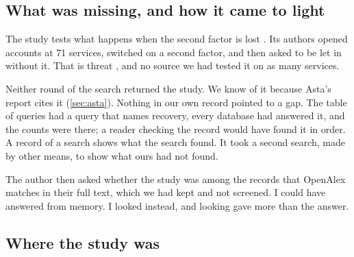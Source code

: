 \subsection{What was missing, and how it came to light}

The study tests what happens when the second factor is lost
\autocite{Klivan2023Recovery}.
Its authors opened accounts at 71 services, switched on a second
factor, and then asked to be let in without it.
That is threat , and no source we had tested it on as many
services.

Neither round of the search returned the study.
We know of it because Asta's report cites it (\cref{sec:asta}).
Nothing in our own record pointed to a gap.
The table of queries had a query that names recovery, every database
had answered it, and the counts were there; a reader checking the
record would have found it in order.
A record of a search shows what the search found.
It took a second search, made by other means, to show what ours had
not found.

The author then asked whether the study was among the records that
OpenAlex matches in their full text, which we had kept and not
screened.
I could have answered from memory.
I looked instead, and looking gave more than the answer.

\subsection{Where the study was}

